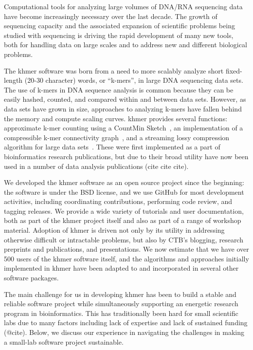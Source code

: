 \documentclass[12pt]{article}
\begin{document}
Computational tools for analyzing large volumes of DNA/RNA sequencing data
have become increasingly necessary over the last decade.  The growth
of sequencing capacity and the associated expansion of scientific
problems being studied with sequencing is driving the rapid development of
many new tools, both for handling data on large scales and to address
new and different biological problems.

The khmer software was born from a need to more scalably analyze short
fixed-length (20-30 character) words, or ``k-mers'', in large DNA
sequencing data sets. The use of k-mers in DNA sequence analysis is
common because they can be easily hashed, counted, and compared within
and between data sets.  However, as data sets have grown in size,
approaches to analyzing k-mers have fallen behind the memory and
compute scaling curves.  khmer provides several functions: approximate
k-mer counting using a CountMin Sketch~\cite{Zhang2013}, an
implementation of a compressible k-mer connectivity
graph~\cite{Pell2012}, and a streaming lossy compression algorithm for
large data sets~\cite{Brown2012}.  These were first implemented as a
part of bioinformatics research publications, but due to their broad
utility have now been used in a number of data analysis publications
(cite cite cite).

We developed the khmer software as an open source project since the
beginning: the software is under the BSD license, and we use GitHub
for most development activities, including coordinating contributions,
performing code review, and tagging releases.  We provide a wide
variety of tutorials and user documentation, both as part of the khmer
project itself and also as part of a range of workshop material.
Adoption of khmer is driven not only by its utility in addressing
otherwise difficult or intractable problems, but also by CTB's
blogging, research preprints and publications, and presentations.  We
now estimate that we have over 500 users of the khmer software itself,
and the algorithms and approaches initially implemented in khmer have
been adapted to and incorporated in several other software packages.

The main challenge for us in developing khmer has been to build a
stable and reliable software project while simultaneously supporting
an energetic research program in bioinformatics.  This has
traditionally been hard for small scientific labs due to many factors
including lack of expertise and lack of sustained funding (@cite).
Below, we discuss our experience in navigating the challenges in making a
small-lab software project sustainable.
\end{document}
